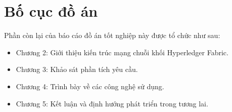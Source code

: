 \documentclass[../DoAn.tex]{subfiles}
\begin{document}
\section{Bố cục đồ án}
\label{section:1.4}
Phần còn lại của báo cáo đồ án tốt nghiệp này được tổ chức như sau:

\begin{itemize}
	\item Chương 2: Giới thiệu kiến trúc mạng chuỗi khối Hyperledger Fabric.
	\item Chương 3: Khảo sát phần tích yêu cầu.
	\item Chương 4: Trình bày về các công nghệ sử dụng.
	\item Chương 5: Kết luận và định hướng phát triển trong tương lai.
\end{itemize}







\end{document}
